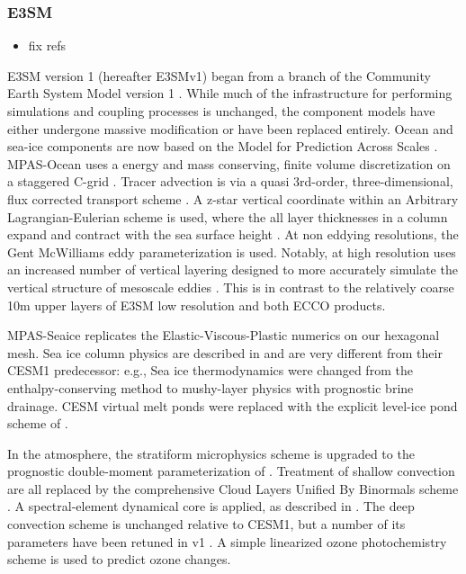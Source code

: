 \subsubsection{E3SM}
\color{red}
\begin{itemize}
    \item fix refs
\end{itemize}
\color{black}
E3SM version 1 (hereafter E3SMv1) began from a branch of the Community Earth System Model version 1 \citep{hurrell2013community}. While much of the infrastructure for performing simulations and coupling processes is unchanged, the component models have either undergone massive modification or have been replaced entirely. Ocean and sea-ice components are now based on the Model for Prediction Across Scales \citep{ringler2013multi,petersen2019evaluation}. MPAS-Ocean uses a energy and mass conserving, finite volume discretization on a staggered C-grid \citep{Arakawa77,thuburn_numerical_2009,ringler2013multi}. Tracer advection is via a quasi 3rd-order, three-dimensional, flux corrected transport scheme \citep{Skamarock_Gassmann11jcp}.  A z-star vertical coordinate within an Arbitrary Lagrangian-Eulerian scheme is used, where the all layer thicknesses in a column expand and contract with the sea surface height \citep{petersen_evaluation_2015,reckinger_study_2015}.  At non eddying resolutions, the Gent McWilliams \citep{gent1990isopycnal} eddy parameterization is used.   Notably, at high resolution uses an increased number of vertical layering designed to more accurately simulate the vertical structure of mesoscale eddies \citep{stewart2017vertical}.  This is in contrast to the relatively coarse 10m upper layers of E3SM low resolution and both ECCO products.  

MPAS-Seaice replicates the \citet{Hunke1997} Elastic-Viscous-Plastic numerics on our hexagonal mesh. Sea ice column physics are described in \cite{golaz2018doe} and are very different from their CESM1 predecessor: e.g., Sea ice thermodynamics were changed from the \cite{bitz1999} enthalpy-conserving method to \cite{turner2015} mushy-layer physics with prognostic brine drainage. CESM virtual melt ponds \citep{Holland_et12} were replaced with the explicit level-ice pond scheme of \cite{hunke2013}.

In the atmosphere, the stratiform microphysics scheme is upgraded to the prognostic double-moment parameterization of \cite{Gettelman_Morrison15, Gettelman_et15}. Treatment of shallow convection are all replaced by the comprehensive Cloud Layers Unified By Binormals scheme \citep{Golaz_et02, Larson_Golaz05, Larson_17}. A spectral-element dynamical core is applied, as described in \cite{Dennis_et12}. The \cite{Zhang_McFarlane95} deep convection scheme is unchanged relative to CESM1, but a number of its parameters have been retuned in v1 \citep{Xie_et18,Rasch_et19,golaz2018doe}.  A simple linearized ozone photochemistry scheme \citep{Hsu_Prather09} is used to predict ozone changes. 

